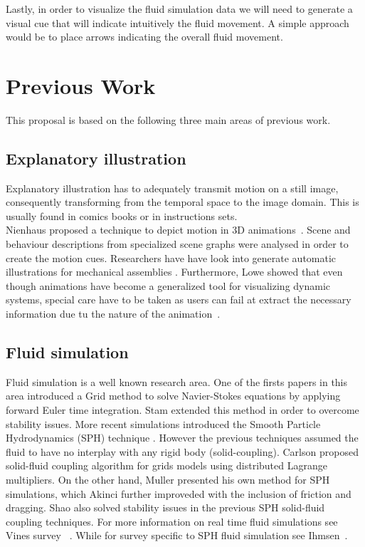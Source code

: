 \documentclass[11pt]{report}
\begin{document}
Lastly, in order to visualize the fluid simulation data we will need to generate a visual cue that will indicate intuitively the fluid movement.
A simple approach would be to place arrows indicating the overall fluid movement.

\section{Previous Work}

This proposal is based on the following three main areas of previous work.

\subsection{Explanatory illustration}

Explanatory illustration has to adequately transmit motion on a still image, consequently transforming from the temporal space to the image domain.
This is usually found in comics books or in instructions sets.\\

Nienhaus proposed a technique to depict motion in 3D animations~\cite{Nienhaus2005}.
Scene and behaviour descriptions from specialized scene graphs were analysed in order to create the motion cues.  
Researchers have have look into generate automatic illustrations for mechanical assemblies \cite{Mitra2010}.
Furthermore, Lowe showed that even though animations have become a generalized tool for visualizing dynamic systems, special care have to be taken as users can fail at extract the necessary information due tu the nature of the animation~\cite{Lowe2014}.


\subsection{Fluid simulation}
\label{prevWorkFluidSim}

Fluid simulation is a well known research area. 
One of the firsts papers in this area introduced a Grid method \cite{Foster1996} to solve Navier-Stokes equations by applying forward Euler time integration. 
Stam \cite{Stam1999} extended this method in order to overcome stability issues.
More recent simulations introduced the Smooth Particle Hydrodynamics (SPH) technique \cite{DesbrunMathieuandGascuel1996}.
However the previous techniques assumed the fluid to have no interplay with any rigid body (solid-coupling).
Carlson \cite{Carlson2004} proposed solid-fluid coupling algorithm for grids models using distributed Lagrange multipliers.
On the other hand, Muller \cite{Muller2004} presented his own method for SPH simulations, which Akinci \cite{Akinci2012} further improveded with the inclusion of friction and dragging. 
Shao \cite{Shao2014} also solved stability issues in the previous SPH solid-fluid coupling techniques.
For more information on real time fluid simulations see Vines survey ~\cite{Vines2012}.
While for survey specific to SPH fluid simulation see Ihmsen~\cite{Ihmsen2014}.
\end{document}
